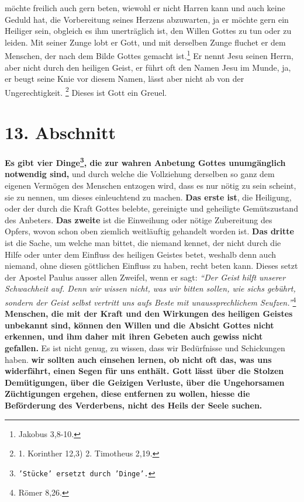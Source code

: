möchte freilich auch
gern beten, wiewohl er nicht Harren kann und auch keine Geduld
hat, die
Vorbereitung seines Herzens abzuwarten, ja er möchte gern ein Heiliger
 sein,
obgleich es ihm unerträglich ist, den Willen Gottes zu tun
oder zu leiden. Mit
seiner Zunge lobt er Gott, und mit derselben Zunge fluchet er dem Menschen, der
nach dem Bilde Gottes gemacht ist.\footnote{Jakobus 3,8-10.}
 Er nennt Jesu
seinen Herrn, aber nicht durch den heiligen Geist, er führt oft den Namen
Jesu im Munde, ja, er beugt seine Knie vor diesem Namen, lässt aber nicht ab
von der Ungerechtigkeit. 
\footnote{1. Korinther 12,3) 2. Timotheus 2,19.}
Dieses ist Gott ein Greuel.

\section{13. Abschnitt} \label{kap6_ab13}

\label{ref:06_13_vier_noetige_dinge}
 \textbf{Es gibt vier
Dinge\footnote{\texttt{'Stücke' ersetzt durch 'Dinge'.}}, die zur wahren Anbetung
Gottes
unumgänglich
notwendig
sind,} und durch welche die Vollziehung derselben so ganz dem eigenen Vermögen
des Menschen entzogen wird, dass es nur nötig zu sein scheint, sie zu nennen,
um dieses einleuchtend zu machen. \textbf{Das erste ist}, die Heiligung, oder
der durch
die Kraft Gottes belebte, gereinigte und geheiligte Gemütszustand des Anbeters.
\textbf{Das zweite} ist die Einweihung oder nötige Zubereitung des Opfers,
wovon schon
oben ziemlich weitläuftig gehandelt worden ist. \textbf{Das dritte} ist die
Sache, um
welche man bittet, die niemand kennet, der nicht durch die Hilfe oder unter dem
Einfluss des heiligen Geistes betet, weshalb
denn auch
niemand, ohne diesen
göttlichen Einfluss zu haben, recht beten kann. Dieses setzt der Apostel
Paulus ausser allen Zweifel, wenn er sagt:
\textit{"`Der Geist hilft unserer
Schwachheit auf. Denn wir wissen nicht, was wir bitten sollen, wie sichs
gebührt, sondern der Geist selbst vertritt uns aufs Beste mit
unaussprechlichem Seufzen."'}\footnote{Römer 8,26.}
\textbf{Menschen, die mit der
Kraft
und den Wirkungen des heiligen Geistes unbekannt sind, können den Willen und die
Absicht Gottes nicht erkennen, und ihm daher mit ihren Gebeten auch gewiss
nicht gefallen.} Es ist nicht genug, zu wissen, dass wir Bedürfnisse und
Schickungen haben.  \textbf{wir sollten auch einsehen
lernen, ob nicht oft das,
was uns
widerfährt, einen Segen für uns enthält. Gott lässt über die
Stolzen
Demütigungen, über die Geizigen Verluste, über die
Ungehorsamen Züchtigungen
ergehen, diese entfernen zu wollen, hiesse die Beförderung des Verderbens, nicht
des Heils der Seele suchen.}

